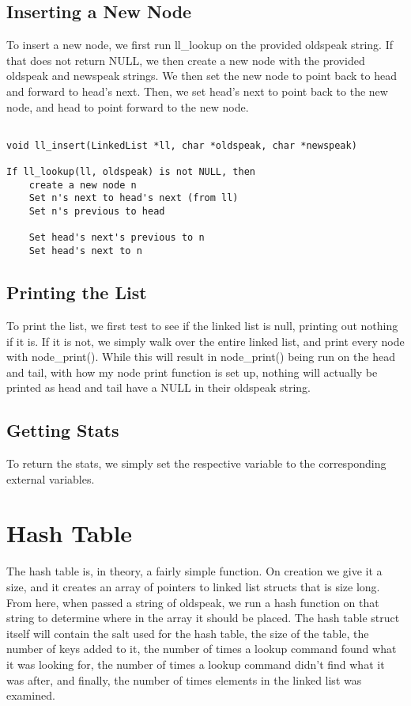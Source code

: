 \documentclass[11pt]{article}
\begin{document}
\subsection{Inserting a New Node}

To insert a new node, we first run ll\_lookup on the provided oldspeak string. If that does not return NULL, we then create a new node with the provided oldspeak and newspeak strings. We then set the new node to point back to head and forward to head's next. Then, we set head's next to point back to the new node, and head to point forward to the new node.

\begin{verbatim}

void ll_insert(LinkedList *ll, char *oldspeak, char *newspeak)

If ll_lookup(ll, oldspeak) is not NULL, then
    create a new node n
    Set n's next to head's next (from ll)
    Set n's previous to head

    Set head's next's previous to n
    Set head's next to n

\end{verbatim}

\subsection{Printing the List}

To print the list, we first test to see if the linked list is null, printing out nothing if it is. If it is not, we simply walk over the entire linked list, and print every node with node\_print(). While this will result in node\_print() being run on the head and tail, with how my node print function is set up, nothing will actually be printed as head and tail have a NULL in their oldspeak string.

\subsection{Getting Stats}

To return the stats, we simply set the respective variable to the corresponding external variables.

\section{Hash Table}

The hash table is, in theory, a fairly simple function. On creation we give it a size, and it creates an array of pointers to linked list structs that is size long. From here, when passed a string of oldspeak, we run a hash function on that string to determine where in the array it should be placed. The hash table struct itself will contain the salt used for the hash table, the size of the table, the number of keys added to it, the number of times a lookup command found what it was looking for, the number of times a lookup command didn't find what it was after, and finally, the number of times elements in the linked list was examined.
\end{document}
